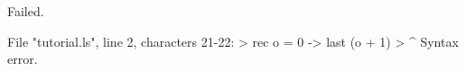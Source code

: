 \runverbatimfalse
{}
\begin{RunVerbatimMsg}
Failed.
\end{RunVerbatimMsg}
\begin{RunVerbatimErr}
File "tutorial.ls", line 2, characters 21-22:
>  rec o = 0 -> last (o + 1)
>                     ^
Syntax error.
\end{RunVerbatimErr}
